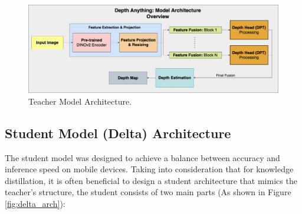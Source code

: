 \begin{figure}[htbp!]
    \centering
    \includegraphics[width=\textwidth]{images/teacher_model_arch.png}
    \caption{Teacher Model Architecture.}
    \label{fig:teacher_arch}
\end{figure}

\subsection{Student Model (Delta) Architecture}
\label{subsec:student_arch}

The student model was designed to achieve a balance between accuracy and inference speed on mobile devices. Taking into consideration that for knowledge distillation, it is often beneficial to design a student architecture that mimics the teacher's structure, the student consists of two main parts (As shown in Figure \ref{fig:delta_arch}):

